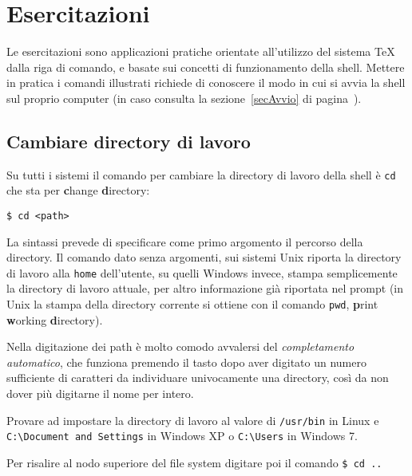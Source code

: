 
\chapter{Esercitazioni}
\label{chapEser}

Le esercitazioni sono applicazioni pratiche orientate all'utilizzo del sistema \TeX{} dalla riga di comando, e basate sui concetti di funzionamento della shell. Mettere in pratica i comandi illustrati richiede di conoscere il modo in cui si avvia la shell sul proprio computer (in caso consulta la sezione~\ref{secAvvio} di pagina~\pageref{secAvvio}).

\section{Cambiare directory di lavoro}

Su tutti i sistemi il comando per cambiare la directory di lavoro della shell è \texttt{cd} che sta per \textbf{c}hange \textbf{d}irectory:

\begin{tcolorbox}
\begin{verbatim}
$ cd <path>
\end{verbatim}
\end{tcolorbox}

La sintassi prevede di specificare come primo argomento il percorso della directory. Il comando dato senza argomenti, sui sistemi Unix riporta la directory di lavoro alla \texttt{home} dell'utente, su quelli Windows invece, stampa semplicemente la directory di lavoro attuale, per altro informazione già riportata nel prompt (in Unix la stampa della directory corrente si ottiene con il comando \texttt{pwd}, \textbf{p}rint \textbf{w}orking \textbf{d}irectory).

Nella digitazione dei path è molto comodo avvalersi del \emph{completamento automatico}, che funziona premendo il tasto  dopo aver digitato un numero sufficiente di caratteri da individuare univocamente una directory, così da non dover più digitarne il nome per intero.

Provare ad impostare la directory di lavoro al valore di \verb=/usr/bin= in Linux e \verb=C:\Document and Settings= in Windows XP o \verb=C:\Users= in Windows 7.

Per risalire al nodo superiore del file system digitare poi il comando \verb=$ cd ..=

